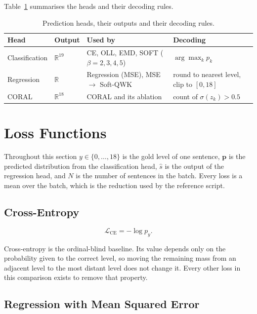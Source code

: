 Table~\ref{tab:meth-heads} summarises the heads and their decoding rules.

\begin{table}[H]
\centering
\footnotesize
\caption{Prediction heads, their outputs and their decoding rules.}
\label{tab:meth-heads}
\begin{tabular}{p{2.6cm} p{1.9cm} p{4.3cm} p{4.0cm}}
\toprule
\textbf{Head} & \textbf{Output} & \textbf{Used by} & \textbf{Decoding} \\
\midrule
Classification & $\mathbb{R}^{19}$ & CE, OLL, EMD, SOFT ($\beta=2,3,4,5$) &
$\arg\max_k p_k$ \\
Regression & $\mathbb{R}$ & Regression (MSE), MSE $\rightarrow$ Soft-QWK &
round to nearest level, clip to $[0,18]$ \\
CORAL & $\mathbb{R}^{18}$ & CORAL and its ablation &
count of $\sigma(z_k) > 0.5$ \\
\bottomrule
\end{tabular}
\end{table}

\section{Loss Functions}
\label{sec:meth-losses}

Throughout this section $y\in\{0,\dots,18\}$ is the gold level of one sentence, $\mathbf{p}$ is
the predicted distribution from the classification head, $\hat{s}$ is the output of the
regression head, and $N$ is the number of sentences in the batch. Every loss is a mean over the
batch, which is the reduction used by the reference script.

\subsection{Cross-Entropy}

\begin{equation}
\mathcal{L}_{\text{CE}} = -\log p_y .
\end{equation}

Cross-entropy is the ordinal-blind baseline. Its value depends only on the probability given to
the correct level, so moving the remaining mass from an adjacent level to the most distant
level does not change it. Every other loss in this comparison exists to remove that property.

\subsection{Regression with Mean Squared Error}

